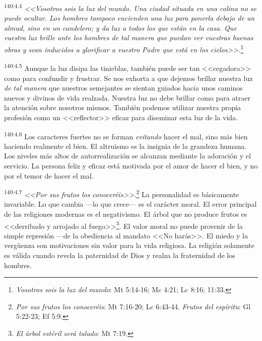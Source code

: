 \par 
\textsuperscript{140:4.4} \textit{<<Vosotros sois la luz del mundo. Una ciudad situada en una colina no se puede ocultar. Los hombres tampoco encienden una luz para ponerla debajo de un almud, sino en un candelero; y da luz a todos los que están en la casa. Que vuestra luz brille ante los hombres de tal manera que puedan ver vuestras buenas obras y sean inducidos a glorificar a vuestro Padre que está en los cielos>>.}\footnote{\textit{Vosotros sois la luz del mundo}: Mt 5:14-16; Mc 4:21; Lc 8:16; 11:33.}

\par 
\textsuperscript{140:4.5} Aunque la luz disipa las tinieblas, también puede ser tan <<cegadora>> como para confundir y frustrar. Se nos exhorta a que dejemos brillar nuestra luz \textit{de tal manera} que nuestros semejantes se sientan guiados hacia unos caminos nuevos y divinos de vida realzada. Nuestra luz no debe brillar como para atraer la atención sobre nosotros mismos. También podemos utilizar nuestra propia profesión como un <<reflector>> eficaz para diseminar esta luz de la vida.

\par 
\textsuperscript{140:4.6} Los caracteres fuertes no se forman \textit{evitando} hacer el mal, sino más bien haciendo realmente el bien. El altruismo es la insignia de la grandeza humana. Los niveles más altos de autorrealización se alcanzan mediante la adoración y el servicio. La persona feliz y eficaz está motivada por el amor de hacer el bien, y no por el temor de hacer el mal.

\par 
\textsuperscript{140:4.7} \textit{<<Por sus frutos los conoceréis>>.}\footnote{\textit{Por sus frutos los conoceréis}: Mt 7:16-20; Lc 6:43-44. \textit{Frutos del espíritu}: Gl 5:22-23; Ef 5:9.} La personalidad es básicamente invariable. Lo que cambia ---lo que crece--- es el carácter moral. El error principal de las religiones modernas es el negativismo. El árbol que no produce frutos es <<derribado y arrojado al fuego>>\footnote{\textit{El árbol estéril será talado}: Mt 7:19.}. El valor moral no puede provenir de la simple represión ---de la obediencia al mandato <<No harás>>. El miedo y la verg\"uenza son motivaciones sin valor para la vida religiosa. La religión solamente es válida cuando revela la paternidad de Dios y realza la fraternidad de los hombres.

